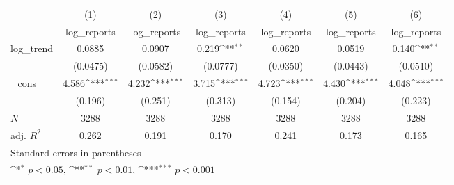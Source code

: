 {
\def\sym#1{\ifmmode^{#1}\else\(^{#1}\)\fi}
\begin{tabular}{l*{6}{c}}
\hline\hline
            &\multicolumn{1}{c}{(1)}&\multicolumn{1}{c}{(2)}&\multicolumn{1}{c}{(3)}&\multicolumn{1}{c}{(4)}&\multicolumn{1}{c}{(5)}&\multicolumn{1}{c}{(6)}\\
            &\multicolumn{1}{c}{log\_reports}&\multicolumn{1}{c}{log\_reports}&\multicolumn{1}{c}{log\_reports}&\multicolumn{1}{c}{log\_reports}&\multicolumn{1}{c}{log\_reports}&\multicolumn{1}{c}{log\_reports}\\
\hline
log\_trend   &      0.0885         &      0.0907         &       0.219\sym{**} &      0.0620         &      0.0519         &       0.140\sym{**} \\
            &    (0.0475)         &    (0.0582)         &    (0.0777)         &    (0.0350)         &    (0.0443)         &    (0.0510)         \\
[1em]
\_cons      &       4.586\sym{***}&       4.232\sym{***}&       3.715\sym{***}&       4.723\sym{***}&       4.430\sym{***}&       4.048\sym{***}\\
            &     (0.196)         &     (0.251)         &     (0.313)         &     (0.154)         &     (0.204)         &     (0.223)         \\
\hline
\(N\)       &        3288         &        3288         &        3288         &        3288         &        3288         &        3288         \\
adj. \(R^{2}\)&       0.262         &       0.191         &       0.170         &       0.241         &       0.173         &       0.165         \\
\hline\hline
\multicolumn{7}{l}{\footnotesize Standard errors in parentheses}\\
\multicolumn{7}{l}{\footnotesize \sym{*} \(p<0.05\), \sym{**} \(p<0.01\), \sym{***} \(p<0.001\)}\\
\end{tabular}
}
